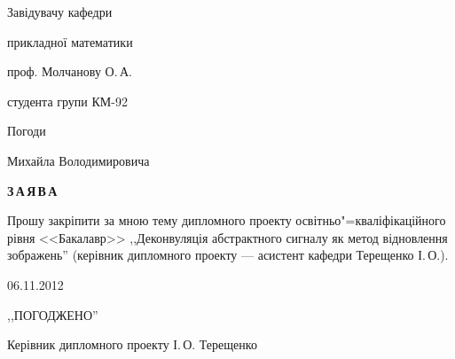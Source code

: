 \documentclass[a4paper,12pt,notitlepage,headsepline,pdftex]{scrartcl}
\begin{document}
\begin{titlepage}
  \hfill
  \begin{minipage}{0.4\textwidth}
    Завідувачу кафедри

    прикладної математики

    проф. Молчанову О.\,А.

    \vspace{0.3cm}

    студента групи КМ-92

    Погоди

    Михайла Володимировича
  \end{minipage}

  \vspace{3cm}
  \begin{center}
    \bf
    З\,А\,Я\,В\,А
  \end{center}

  \vspace{1cm}

  Прошу закріпити за мною тему дипломного проекту освітньо"=кваліфікаційного
  рівня <<Бакалавр>> ,,Деконвуляція абстрактного сигналу як метод відновлення
  зображень'' (керівник дипломного проекту --- асистент кафедри
  Терещенко І.\,О.).

  \vspace{1cm}

  \hspace{1cm}06.11.2012

  \hfill\underline{\hspace{2cm}}\hspace{1cm}

  \vspace{5cm}

  ,,ПОГОДЖЕНО''

  \vspace{0.5cm}

  Керівник дипломного проекту\hfill\underline{\hspace{2cm}}\hspace{1cm} І.\,О.
  Терещенко

\end{titlepage}
\end{document}
